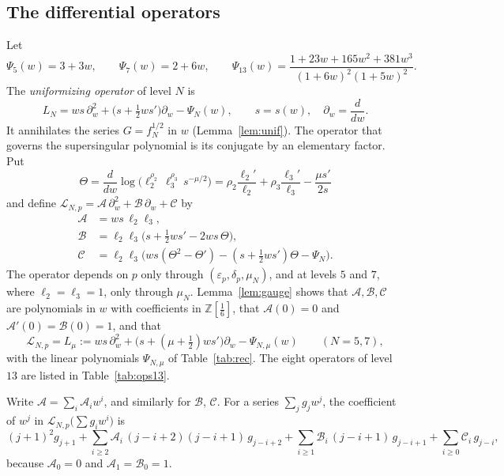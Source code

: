 \documentclass[11pt,a4paper]{article}
\theoremstyle{definition}
\theoremstyle{remark}
\newcommand{\Z}{\mathbb{Z}}
\newcommand{\cL}{\mathcal{L}}
\newcommand{\cA}{\mathcal{A}}
\newcommand{\cB}{\mathcal{B}}
\newcommand{\cC}{\mathcal{C}}
\newcommand{\dw}{\partial_w}
\numberwithin{equation}{section}
\begin{document}
\subsection{The differential operators}\label{subsec:ops}

Let
\begin{equation}\label{eq:Psi}
\Psi_5(w)=3+3w,\qquad\Psi_7(w)=2+6w,\qquad
\Psi_{13}(w)=\frac{1+23w+165w^2+381w^3}{(1+6w)^2(1+5w)^2}.
\end{equation}
The \emph{uniformizing operator} of level $N$ is
\begin{equation}\label{eq:LG}
L_N=ws\,\dw^2+\bigl(s+\tfrac12ws'\bigr)\dw-\Psi_N(w),\qquad s=s(w),\quad \dw=\frac{d}{dw}.
\end{equation}
It annihilates the series $G=f_N^{1/2}$ in $w$ (Lemma~\ref{lem:unif}). The
operator that governs the supersingular polynomial is its conjugate by an
elementary factor. Put
\begin{equation}\label{eq:Theta}
\Theta=\frac{d}{dw}\log\bigl(\ell_2^{\rho_2}\,\ell_3^{\rho_3}\,s^{-\mu/2}\bigr)
=\rho_2\frac{\ell_2'}{\ell_2}+\rho_3\frac{\ell_3'}{\ell_3}-\frac{\mu s'}{2s}
\end{equation}
and define $\cL_{N,p}=\cA\,\dw^2+\cB\,\dw+\cC$ by
\begin{equation}\label{eq:gaugeop}
\begin{aligned}
\cA&=ws\,\ell_2\ell_3,\\
\cB&=\ell_2\ell_3\bigl(s+\tfrac12ws'-2ws\,\Theta\bigr),\\
\cC&=\ell_2\ell_3\bigl(ws(\Theta^2-\Theta')-(s+\tfrac12ws')\Theta-\Psi_N\bigr).
\end{aligned}
\end{equation}
The operator depends on $p$ only through $(\varepsilon_p,\delta_p,\mu_N)$, and
at levels $5$ and $7$, where $\ell_2=\ell_3=1$, only through $\mu_N$.
Lemma~\ref{lem:gauge} shows that $\cA,\cB,\cC$ are polynomials in $w$ with
coefficients in $\Z[\frac16]$, that $\cA(0)=0$ and $\cA'(0)=\cB(0)=1$, and that
\begin{equation}\label{eq:Lmu}
\cL_{N,p}=L_\mu:=ws\,\dw^2+\bigl(s+(\mu+\tfrac12)ws'\bigr)\dw-\Psi_{N,\mu}(w)
\qquad(N=5,7),
\end{equation}
with the linear polynomials $\Psi_{N,\mu}$ of Table~\ref{tab:rec}. The eight
operators of level $13$ are listed in Table~\ref{tab:ops13}.

Write $\cA=\sum_i\cA_iw^i$, and similarly for $\cB$, $\cC$. For a series
$\sum_jg_jw^j$, the coefficient of $w^j$ in $\cL_{N,p}\bigl(\sum g_iw^i\bigr)$ is
\begin{equation}\label{eq:rec}
(j+1)^2g_{j+1}+\sum_{i\ge2}\cA_i\,(j-i+2)(j-i+1)\,g_{j-i+2}
+\sum_{i\ge1}\cB_i\,(j-i+1)\,g_{j-i+1}+\sum_{i\ge0}\cC_i\,g_{j-i},
\end{equation}
because $\cA_0=0$ and $\cA_1=\cB_0=1$.
\end{document}
